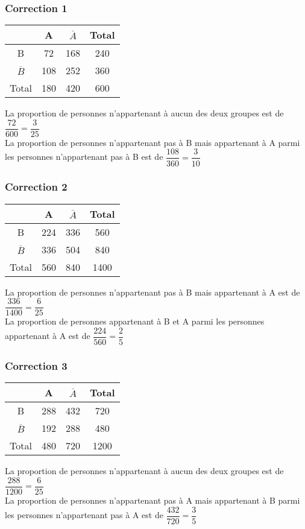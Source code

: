 \documentclass[15pt, mathserif]{beamer}
\begin{document}
\begin{frame}
\vspace{-10mm}
	\frametitle{Correction 1}
\begin{center} 
 \begin{tabular}{|c|c|c|c|} 
 \cline{2-4} 
 \multicolumn{1}{c|}{} & A & $\overline{A}$ & Total \\\hline 
 B   &72  &168& 240 \\\hline 
 $\overline{B}$   &108 & 252 & 360 \\\hline 
 Total   &180&420 &600 \\\hline  
 \end{tabular} 
 \end{center}
 La proportion de personnes n'appartenant à aucun des deux groupes est de $\dfrac{72}{600 }= \dfrac{3}{25}$
 \\ La proportion de personnes n'appartenant pas à B mais appartenant à A parmi les personnes n'appartenant pas à B est de $\dfrac{108}{360 }= \dfrac{3}{10}$
\end{frame}


\begin{frame}
\vspace{-10mm}
	\frametitle{Correction 2}
\begin{center} 
 \begin{tabular}{|c|c|c|c|} 
 \cline{2-4} 
 \multicolumn{1}{c|}{} & A & $\overline{A}$ & Total \\\hline 
 B   &224  &336& 560 \\\hline 
 $\overline{B}$   &336 & 504 & 840 \\\hline 
 Total   &560&840 &1400 \\\hline  
 \end{tabular} 
 \end{center}
 La proportion de personnes n'appartenant pas à B mais appartenant à A est de $\dfrac{336}{1400 }= \dfrac{6}{25}$
 \\ La proportion de personnes appartenant à B et A parmi les personnes appartenant à A est de $\dfrac{224}{560 }= \dfrac{2}{5}$
\end{frame}


\begin{frame}
\vspace{-10mm}
	\frametitle{Correction 3}
\begin{center} 
 \begin{tabular}{|c|c|c|c|} 
 \cline{2-4} 
 \multicolumn{1}{c|}{} & A & $\overline{A}$ & Total \\\hline 
 B   &288  &432& 720 \\\hline 
 $\overline{B}$   &192 & 288 & 480 \\\hline 
 Total   &480&720 &1200 \\\hline  
 \end{tabular} 
 \end{center}
 La proportion de personnes n'appartenant à aucun des deux groupes est de $\dfrac{288}{1200 }= \dfrac{6}{25}$
 \\ La proportion de personnes n'appartenant pas à A mais appartenant à B parmi les personnes n'appartenant pas à A est de $\dfrac{432}{720 }= \dfrac{3}{5}$
\end{frame}
\end{document}
